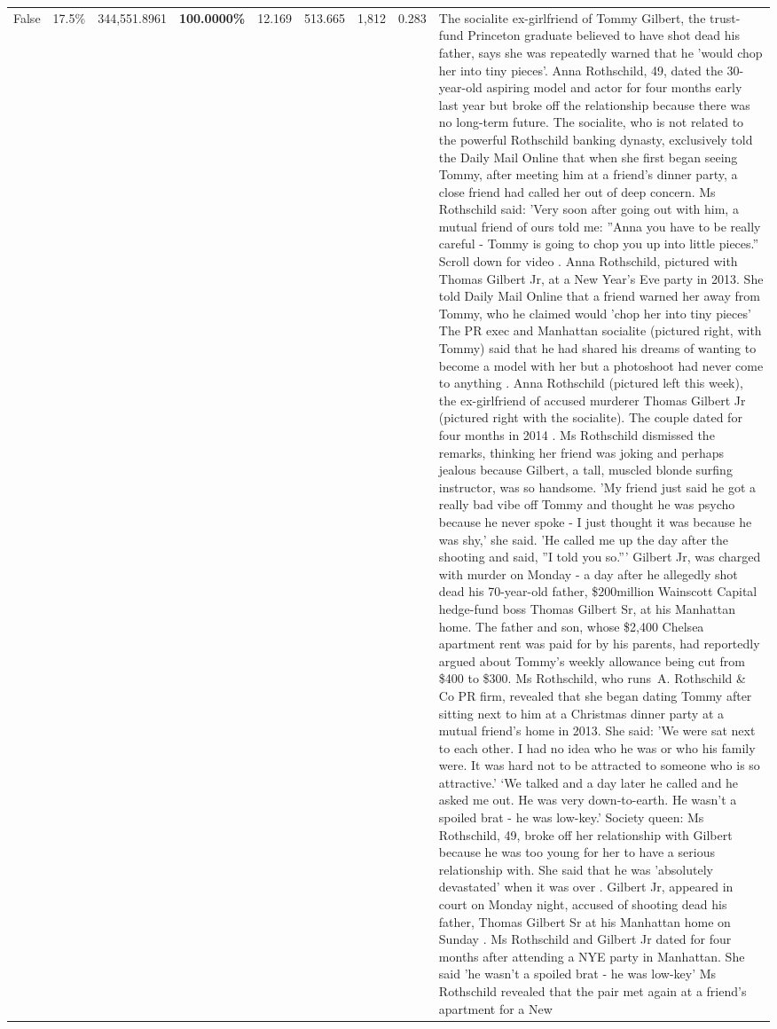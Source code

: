 \begin{table}[H]
\begin{tabular}{lllrlllll}
False & 17.5\% & 344,551.8961 & \bfseries \color{red} 100.0000\% & 12.169 & 513.665 & 1,812 & 0.283 & The socialite ex-girlfriend of Tommy Gilbert, the trust-fund Princeton graduate believed to have shot dead his father, says she was repeatedly warned that he 'would chop her into tiny pieces'. Anna Rothschild, 49, dated the 30-year-old aspiring model and actor for four months early last year but broke off the relationship because there was no long-term future. The socialite, who is not related to the powerful Rothschild banking dynasty, exclusively told the Daily Mail Online that when she first began seeing Tommy, after meeting him at a friend's dinner party, a close friend had called her out of deep concern. Ms Rothschild said: 'Very soon after going out with him, a mutual friend of ours told me: ''Anna you have to be really careful - Tommy is going to chop you up into little pieces.'' Scroll down for video . Anna Rothschild, pictured with Thomas Gilbert Jr, at a New Year's Eve party in 2013. She told Daily Mail Online that a friend warned her away from Tommy, who he claimed would 'chop her into tiny pieces' The PR exec and Manhattan socialite (pictured right, with Tommy) said that he had shared his dreams of wanting to become a model with her but a photoshoot had never come to anything . Anna Rothschild (pictured left this week), the ex-girlfriend of accused murderer Thomas Gilbert Jr (pictured right with the socialite). The couple dated for four months in 2014 . Ms Rothschild dismissed the remarks, thinking her friend was joking and perhaps jealous because Gilbert, a tall, muscled blonde surfing instructor, was so handsome. 'My friend just said he got a really bad vibe off Tommy and thought he was psycho because he never spoke - I just thought it was because he was shy,' she said. 'He called me up the day after the shooting and said, ''I told you so.''' Gilbert Jr, was charged with murder on Monday - a day after he allegedly shot dead his 70-year-old father, \$200million Wainscott Capital hedge-fund boss Thomas Gilbert Sr, at his Manhattan home. The father and son, whose \$2,400 Chelsea apartment rent was paid for by his parents, had reportedly argued about Tommy's weekly allowance being cut from \$400 to \$300. Ms Rothschild, who runs A. Rothschild \& Co PR firm, revealed that she began dating Tommy after sitting next to him at a Christmas dinner party at a mutual friend's home in 2013. She said: 'We were sat next to each other. I had no idea who he was or who his family were. It was hard not to be attracted to someone who is so attractive.' ‘We talked and a day later he called and he asked me out. He was very down-to-earth. He wasn’t a spoiled brat - he was low-key.’ Society queen: Ms Rothschild, 49, broke off her relationship with Gilbert because he was too young for her to have a serious relationship with. She said that he was 'absolutely devastated' when it was over . Gilbert Jr, appeared in court on Monday night, accused of shooting dead his father, Thomas Gilbert Sr at his Manhattan home on Sunday . Ms Rothschild and Gilbert Jr dated for four months after attending a NYE party in Manhattan. She said 'he wasn't a spoiled brat - he was low-key' Ms Rothschild revealed that the pair met again at a friend’s apartment for a New 
\end{tabular}
\end{table}
